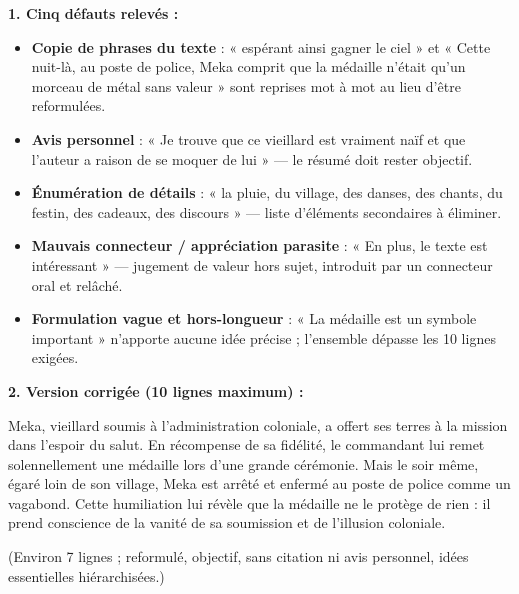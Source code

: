 \documentclass[11pt]{article}
\begin{document}
\begin{corrige}
\textbf{1. Cinq défauts relevés :}
\begin{itemize}
\item \textbf{Copie de phrases du texte} : « espérant ainsi gagner le ciel » et « Cette nuit-là, au poste de police, Meka comprit que la médaille n'était qu'un morceau de métal sans valeur » sont reprises mot à mot au lieu d'être reformulées.
\item \textbf{Avis personnel} : « Je trouve que ce vieillard est vraiment naïf et que l'auteur a raison de se moquer de lui » — le résumé doit rester objectif.
\item \textbf{Énumération de détails} : « la pluie, du village, des danses, des chants, du festin, des cadeaux, des discours » — liste d'éléments secondaires à éliminer.
\item \textbf{Mauvais connecteur / appréciation parasite} : « En plus, le texte est intéressant » — jugement de valeur hors sujet, introduit par un connecteur oral et relâché.
\item \textbf{Formulation vague et hors-longueur} : « La médaille est un symbole important » n'apporte aucune idée précise ; l'ensemble dépasse les 10 lignes exigées.
\end{itemize}
\textbf{2. Version corrigée (10 lignes maximum) :}

Meka, vieillard soumis à l'administration coloniale, a offert ses terres à la mission dans l'espoir du salut. En récompense de sa fidélité, le commandant lui remet solennellement une médaille lors d'une grande cérémonie. Mais le soir même, égaré loin de son village, Meka est arrêté et enfermé au poste de police comme un vagabond. Cette humiliation lui révèle que la médaille ne le protège de rien : il prend conscience de la vanité de sa soumission et de l'illusion coloniale.

(Environ 7 lignes ; reformulé, objectif, sans citation ni avis personnel, idées essentielles hiérarchisées.)
\end{corrige}
\end{document}
